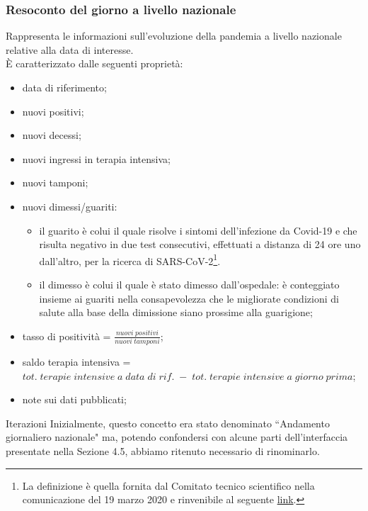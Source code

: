 \subsubsection{Resoconto del giorno a livello nazionale}
\label{sss:resoconto-del-giorno-livello-nazionale}
Rappresenta le informazioni sull'evoluzione della pandemia a livello nazionale relative alla data di interesse.\\
È caratterizzato dalle seguenti proprietà:
\begin{itemize}
    \item data di riferimento;
    \item nuovi positivi;
    \item nuovi decessi;
    \item nuovi ingressi in terapia intensiva;
    \item nuovi tamponi;
    \item nuovi dimessi/guariti:
    \begin{itemize}
        \item il guarito è colui il quale risolve i sintomi dell’infezione da Covid-19 e che risulta negativo in due test consecutivi, effettuati a distanza di 24 ore uno dall’altro, per la ricerca di SARS-CoV-2\footnote{La definizione è quella fornita dal Comitato tecnico scientifico nella comunicazione del 19 marzo 2020 e rinvenibile al seguente \href{http://www.salute.gov.it/portale/nuovocoronavirus/dettaglioNotizieNuovoCoronavirus.jsp?lingua=italiano&menu=notizie&p=dalministero&id=4274}{link}.}.
        \item il dimesso è colui il quale è stato dimesso dall'ospedale: è conteggiato insieme ai guariti nella consapevolezza che le migliorate condizioni di salute alla base della dimissione siano prossime alla guarigione;
    \end{itemize}
    \item tasso di positività = $\frac{nuovi \; positivi}{nuovi \; tamponi}$;
    \item saldo terapia intensiva = $tot. \; terapie \; intensive \; a \; data \; di \; rif. \; - \; tot. \; terapie \; intensive \; a \; giorno \; prima$;
    \item note sui dati pubblicati;
\end{itemize}
\begin{bclogo}{Iterazioni}
Inizialmente, questo concetto era stato denominato ``Andamento giornaliero nazionale" ma, potendo confondersi con alcune parti dell'interfaccia presentate nella Sezione 4.5, abbiamo ritenuto necessario di rinominarlo.
\end{bclogo}

